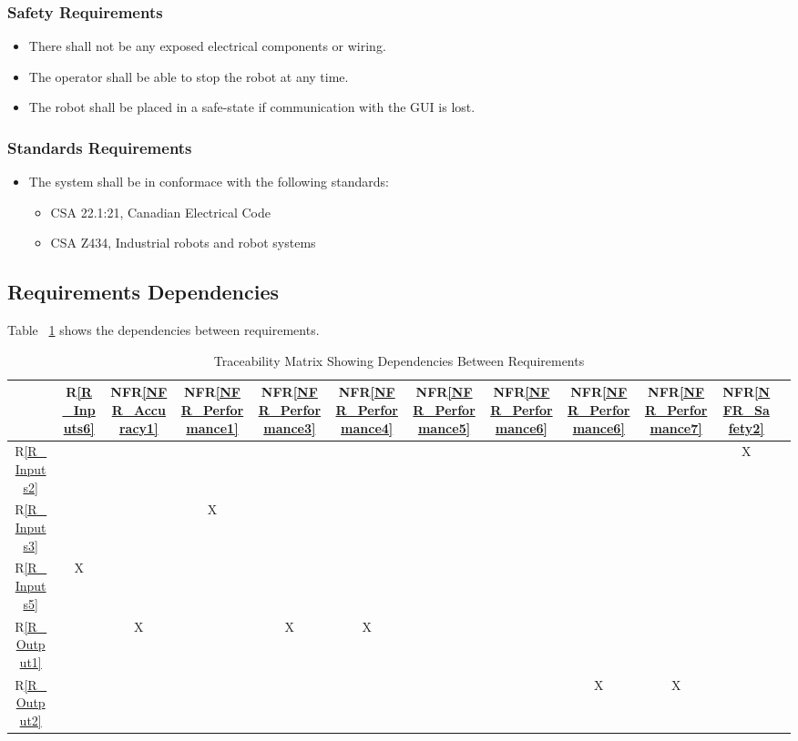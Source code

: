\documentclass[12pt]{article}
\newcommand{\rref}[1]{R\ref{#1}}
\newcounter{nfrnum} %
\newcommand{\nfrref}[1]{NFR\ref{#1}}
\begin{document}
\subsubsection{Safety Requirements}
\noindent \begin{itemize}
\item[NFR\refstepcounter{nfrnum}\thenfrnum \label{NFR_Safety1}:] There shall not be any exposed electrical components or wiring.
\item[NFR\refstepcounter{nfrnum}\thenfrnum \label{NFR_Safety2}:] The operator shall be able to stop the robot at any time.
\item[NFR\refstepcounter{nfrnum}\thenfrnum \label{NFR_Safety3}:] The robot shall be placed in a safe-state if communication with the GUI is lost.
\end{itemize}

\subsubsection{Standards Requirements}
\noindent \begin{itemize}
\item[NFR\refstepcounter{nfrnum}\thenfrnum \label{NFR_Standard1}:] The system shall be in conformace with the following standards:
\begin{itemize}
\item CSA 22.1:21, Canadian Electrical Code \cite{CSA1}
\item CSA Z434, Industrial robots and robot systems \cite{CSA2}
\end{itemize}
\end{itemize}

\subsection{Requirements Dependencies}

Table ~\ref{Table:A_trace} shows the dependencies between requirements.

\begin{table}[H]
\centering
\begin{tabular}{|c|c|c|c|c|c|c|c|c|c|c|c|}
\hline
	& \rref{R_Inputs6}& \nfrref{NFR_Accuracy1}& \nfrref{NFR_Performance1}& \nfrref{NFR_Performance3}& \nfrref{NFR_Performance4}& \nfrref{NFR_Performance5}& \nfrref{NFR_Performance6}& \nfrref{NFR_Performance6}& \nfrref{NFR_Performance7}& \nfrref{NFR_Safety2} \\
\hline
\rref{R_Inputs2}      & & & & & & & & & &X\\ 
\hline
\rref{R_Inputs3}      & & &X & & & & & & &\\ 
\hline
\rref{R_Inputs5}      &X & & & & & & & & &\\  
\hline
\rref{R_Output1}      & &X & &X &X & & & & &\\ 
\hline
\rref{R_Output2}      & & & & & & & &X &X &\\ 
\hline
\end{tabular}
\caption{Traceability Matrix Showing Dependencies Between Requirements}
\label{Table:A_trace}
\end{table}
\end{document}
